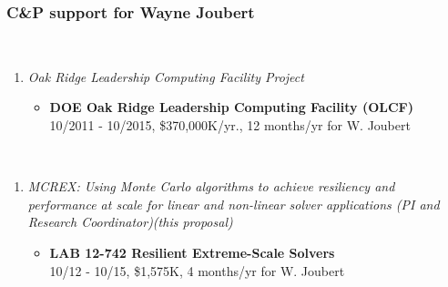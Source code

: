 
\subsubsection{C\&P support for Wayne Joubert}

\\

\begin{enumerate}
  \vspace{-2ex}
  \parskip = -2pt
  
\item {\em Oak Ridge Leadership Computing Facility Project}
  \begin{itemize}
  \item
    {\bf DOE Oak Ridge Leadership Computing Facility (OLCF)}\\
    10/2011 - 10/2015, \$370,000K/yr.,  12 months/yr for W. Joubert
  \end{itemize}
  
\end{enumerate}


\\

\begin{enumerate}
  \vspace{-2ex}
  \parskip = -2pt

\item{\em MCREX: Using Monte Carlo algorithms to achieve resiliency 
    and performance at scale for linear and non-linear solver
    applications (PI and Research Coordinator)(this proposal)}
  \begin{itemize}
  \item
    {\bf LAB 12-742 Resilient Extreme-Scale Solvers}\\
    10/12 - 10/15, \$1,575K, 4 months/yr for W. Joubert
  \end{itemize}
  
\end{enumerate}



